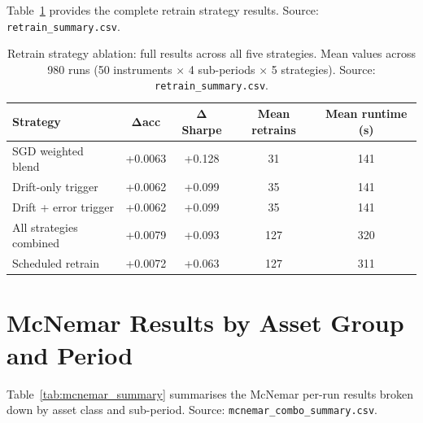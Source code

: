 \begin{appendices}
Table~\ref{tab:retrain_full} provides the complete retrain strategy results.
Source: \texttt{retrain\_summary.csv}.

\begin{table}[htbp]
  \centering
  \caption{Retrain strategy ablation: full results across all five strategies.
    Mean values across 980 runs (50 instruments $\times$ 4 sub-periods $\times$
    5 strategies).  Source: \texttt{retrain\_summary.csv}.}
  \label{tab:retrain_full}
  \begin{tabular}{lcccc}
    \hline
    \textbf{Strategy} & $\bm{\Delta}$\textbf{acc} & $\bm{\Delta}$\textbf{Sharpe}
      & \textbf{Mean retrains} & \textbf{Mean runtime (s)} \\
    \hline
    SGD weighted blend         & +0.0063 & +0.128 & 31 & 141 \\
    Drift-only trigger         & +0.0062 & +0.099 & 35 & 141 \\
    Drift + error trigger      & +0.0062 & +0.099 & 35 & 141 \\
    All strategies combined    & +0.0079 & +0.093 & 127 & 320 \\
    Scheduled retrain          & +0.0072 & +0.063 & 127 & 311 \\
    \hline
  \end{tabular}
\end{table}

\section{McNemar Results by Asset Group and Period}

Table~\ref{tab:mcnemar_summary} summarises the McNemar per-run results broken down
by asset class and sub-period.  Source: \texttt{mcnemar\_combo\_summary.csv}.


\end{appendices}
